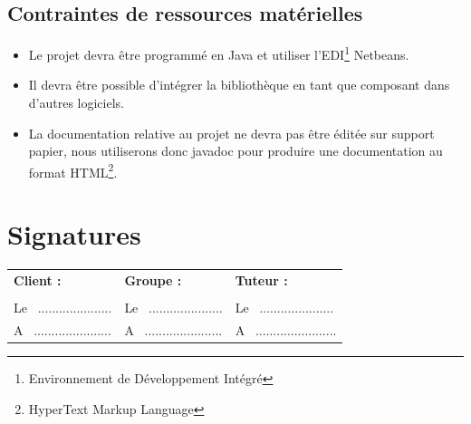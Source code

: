 \documentclass[12pt,a4paper,openany]{article}
\begin{document}
	\subsection{Contraintes de ressources matérielles}
	\begin{itemize}
		\item Le projet devra être programmé en Java et utiliser l'EDI\footnote{Environnement de Développement Intégré} Netbeans. 
		\item Il devra être possible d'intégrer la bibliothèque en tant que composant dans d'autres logiciels. 
		\item La documentation relative au projet ne devra pas être éditée sur support papier, nous utili\-serons donc javadoc pour produire une documentation 
			au format HTML\footnote{HyperText Markup Language}.  
	\end{itemize}
	

\section*{Signatures}
\vspace{20px}
\begin{tabular}[center]{p{175px}p{175px}p{175px}}
  \textbf{Client :} & \textbf{Groupe :} & \textbf{Tuteur :} \\
  \\
  Le ~..................... & Le ~..................... & Le ~..................... \\
  A ~...................... & A ~...................... & A ~....................... \\
\end{tabular}
\newpage
\appendix
\end{document}

